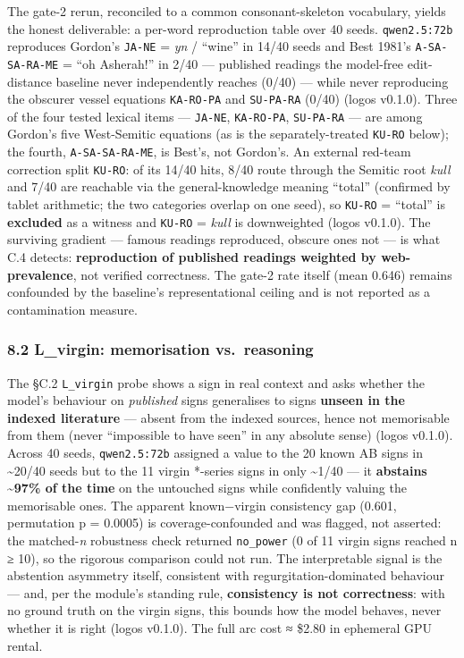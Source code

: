 \documentclass[
  10pt,
]{article}
\begin{document}
The gate-2 rerun, reconciled to a common consonant-skeleton vocabulary,
yields the honest deliverable: a per-word reproduction table over 40
seeds. \texttt{qwen2.5:72b} reproduces Gordon's \texttt{JA-NE} =
\emph{yn} / ``wine'' in 14/40 seeds and Best 1981's
\texttt{A-SA-SA-RA-ME} = ``oh Asherah!'' in 2/40 --- published readings
the model-free edit-distance baseline never independently reaches (0/40)
--- while never reproducing the obscurer vessel equations
\texttt{KA-RO-PA} and \texttt{SU-PA-RA} (0/40) (logos v0.1.0). Three of
the four tested lexical items --- \texttt{JA-NE}, \texttt{KA-RO-PA},
\texttt{SU-PA-RA} --- are among Gordon's five West-Semitic equations (as
is the separately-treated \texttt{KU-RO} below); the fourth,
\texttt{A-SA-SA-RA-ME}, is Best's, not Gordon's. An external red-team
correction split \texttt{KU-RO}: of its 14/40 hits, 8/40 route through
the Semitic root \emph{kull} and 7/40 are reachable via the
general-knowledge meaning ``total'' (confirmed by tablet arithmetic; the
two categories overlap on one seed), so \texttt{KU-RO} = ``total'' is
\textbf{excluded} as a witness and \texttt{KU-RO} = \emph{kull} is
downweighted (logos v0.1.0). The surviving gradient --- famous readings
reproduced, obscure ones not --- is what C.4 detects:
\textbf{reproduction of published readings weighted by web-prevalence},
not verified correctness. The gate-2 rate itself (mean 0.646) remains
confounded by the baseline's representational ceiling and is not
reported as a contamination measure.

\hypertarget{l_virgin-memorisation-vs.-reasoning}{%
\subsubsection{8.2 L\_virgin: memorisation
vs.~reasoning}\label{l_virgin-memorisation-vs.-reasoning}}

The §C.2 \texttt{L\_virgin} probe shows a sign in real context and asks
whether the model's behaviour on \emph{published} signs generalises to
signs \textbf{unseen in the indexed literature} --- absent from the
indexed sources, hence not memorisable from them (never ``impossible to
have seen'' in any absolute sense) (logos v0.1.0). Across 40 seeds,
\texttt{qwen2.5:72b} assigned a value to the 20 known AB signs in
\textasciitilde20/40 seeds but to the 11 virgin *-series signs in only
\textasciitilde1/40 --- it \textbf{abstains \textasciitilde97\% of the
time} on the untouched signs while confidently valuing the memorisable
ones. The apparent known−virgin consistency gap (0.601, permutation p =
0.0005) is coverage-confounded and was flagged, not asserted: the
matched-\emph{n} robustness check returned \texttt{no\_power} (0 of 11
virgin signs reached n ≥ 10), so the rigorous comparison could not run.
The interpretable signal is the abstention asymmetry itself, consistent
with regurgitation-dominated behaviour --- and, per the module's
standing rule, \textbf{consistency is not correctness}: with no ground
truth on the virgin signs, this bounds how the model behaves, never
whether it is right (logos v0.1.0). The full arc cost ≈ \$2.80 in
ephemeral GPU rental.
\end{document}

